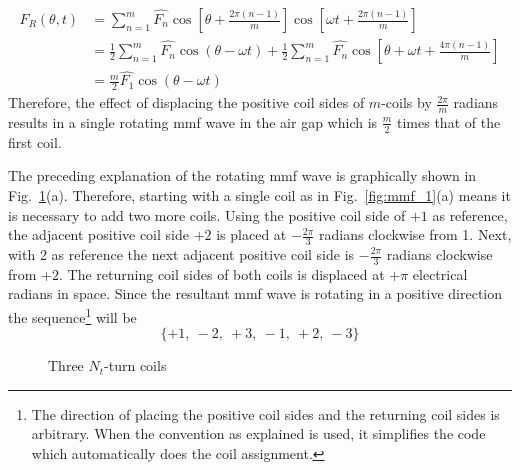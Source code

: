 \begin{equation}
  \label{eqn:F_theta_t_4}
  \begin{aligned}
  F_R(\theta,t)&=\sum_{n=1}^{m}\hat{F_n}\cos\left[\theta+\frac{2\pi(n-1)}{m}\right]
  \cos\left[\omega t +\frac{2\pi(n-1)}{m}\right] \\
  &=\frac{1}{2}\sum_{n=1}^{m}\hat{F_n}\cos(\theta-\omega t)+
  \frac{1}{2}\sum_{n=1}^{m}\hat{F_n}
  \cos\left[\theta+\omega t+\frac{4\pi(n-1)}{m}\right] \\
  &=\frac{m}{2}\hat{F_1}\cos(\theta-\omega t)
  \end{aligned}
\end{equation} 
Therefore, the effect of displacing the positive coil sides of $m$-coils by $\frac{2\pi}{m}$ radians results in a single rotating mmf wave in the air gap which is $\frac{m}{2}$ times that of the first coil.

The preceding explanation of the rotating mmf wave is graphically shown in Fig.~\ref{fig:mmf_2}(a). Therefore, starting with a single coil as in Fig.~\ref{fig:mmf_1}(a) means it is necessary to add two more coils. Using the positive coil side of $+1$ as reference, the adjacent positive coil side $+2$ is placed at $-\frac{2\pi}{3}$ radians clockwise from \num{+1}. Next, with \num{+2} as reference the next adjacent positive coil side is $-\frac{2\pi}{3}$ radians clockwise from $+2$. The returning coil sides of both coils is displaced at $+\pi$ electrical radians in space. Since the resultant mmf wave is rotating in a positive direction the sequence\footnote{The direction of placing the positive coil sides and the returning coil sides is arbitrary. When the convention as explained is used, it simplifies the code which automatically does the coil assignment.} will be 
\begin{equation}
  \label{eqn:phasebelt_sequence}
  \{+1,\ -2,\ +3,\ -1,\ +2,\  -3\} 
\end{equation}

\begin{figure}
  \centering
  \fontsize{8}{10}\selectfont
  \hfill
  \caption{Three $N_t$-turn coils}
  \label{fig:mmf_2}
\end{figure}

